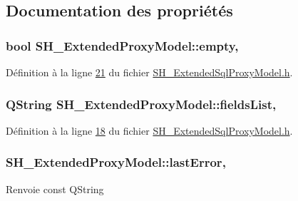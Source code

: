 \subsection{Documentation des propriétés}
\hypertarget{classSH__ExtendedProxyModel_a9e22d17af7776aca8052084cc33c3442}{
\subsubsection[{empty}]{\setlength{\rightskip}{0pt plus 5cm}bool S\-H\-\_\-\-Extended\-Proxy\-Model\-::empty\hspace{0.3cm}{\ttfamily [read]}, {\ttfamily [inherited]}}}\label{classSH__ExtendedProxyModel_a9e22d17af7776aca8052084cc33c3442}


Définition à la ligne \hyperlink{SH__ExtendedSqlProxyModel_8h_source_l00021}{21} du fichier \hyperlink{SH__ExtendedSqlProxyModel_8h_source}{S\-H\-\_\-\-Extended\-Sql\-Proxy\-Model.\-h}.

\hypertarget{classSH__ExtendedProxyModel_a15e779ba92384a57442d6bd79ef3d1d1}{
\subsubsection[{fields\-List}]{\setlength{\rightskip}{0pt plus 5cm}Q\-String S\-H\-\_\-\-Extended\-Proxy\-Model\-::fields\-List\hspace{0.3cm}{\ttfamily [read]}, {\ttfamily [inherited]}}}\label{classSH__ExtendedProxyModel_a15e779ba92384a57442d6bd79ef3d1d1}


Définition à la ligne \hyperlink{SH__ExtendedSqlProxyModel_8h_source_l00018}{18} du fichier \hyperlink{SH__ExtendedSqlProxyModel_8h_source}{S\-H\-\_\-\-Extended\-Sql\-Proxy\-Model.\-h}.

\hypertarget{classSH__ExtendedProxyModel_a287d34971582bbe68a7f1f0826165de5}{
\subsubsection[{last\-Error}]{\setlength{\rightskip}{0pt plus 5cm}S\-H\-\_\-\-Extended\-Proxy\-Model\-::last\-Error\hspace{0.3cm}{\ttfamily [read]}, {\ttfamily [inherited]}}}\label{classSH__ExtendedProxyModel_a287d34971582bbe68a7f1f0826165de5}
\begin{DoxyReturn}{Renvoie}
const Q\-String 
\end{DoxyReturn}


